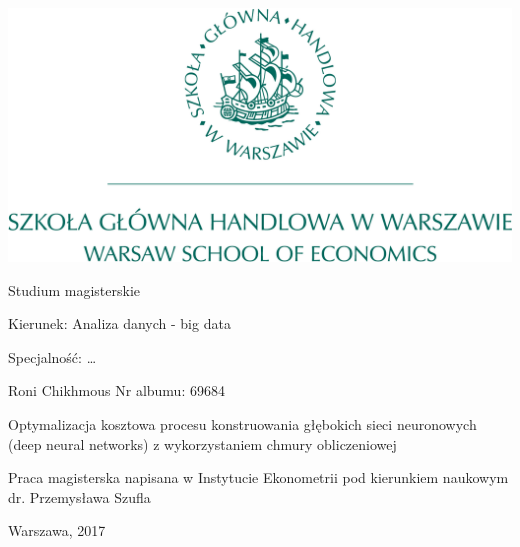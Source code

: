 \documentclass[12pt,a4paper,twoside]{article}
\begin{document}
\begin{center}

  \includegraphics[scale=0.3]{../obrazy/sgh_full.png}

  \vspace{1cm}
  Studium magisterskie

\end{center}

\vspace{1cm}

\noindent Kierunek: Analiza danych - big data

\noindent Specjalność: \dots

\vspace{1cm}

{
\leftskip=10cm\noindent
Roni Chikhmous\newline
Nr albumu: 69684

}

\vspace{2cm}

\begin{center}
  \LARGE
  Optymalizacja kosztowa procesu konstruowania głębokich sieci neuronowych (deep neural networks) z wykorzystaniem chmury obliczeniowej
\end{center}

\vspace{1cm}

{
\leftskip=10cm\noindent
Praca magisterska napisana\newline
w Instytucie Ekonometrii\newline
pod kierunkiem naukowym\newline
dr. Przemysława Szufla

}

\vfill

\begin{center}
Warszawa, 2017
\end{center}
\thispagestyle{empty}
\end{document}
